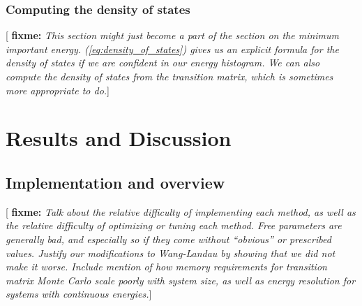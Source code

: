 \documentclass[11pt]{article}
\newcommand{\red}[1]{{\bf \color{red} #1}}
\newcommand{\fixme}[1]{[\red{fixme:} \emph{#1}]}
\begin{document}
\subsubsection{Computing the density of states}
\label{sec:dos}

\fixme{This section might just become a part of the section on the
  minimum important energy. (\ref{eq:density_of_states}) gives us an
  explicit formula for the density of states if we are confident in
  our energy histogram. We can also compute the density of states from
  the transition matrix, which is sometimes more appropriate to do.}





\section{Results and Discussion}
\label{sec:results}

\subsection{Implementation and overview}
\label{sec:implementation}

\fixme{Talk about the relative difficulty of implementing each method,
  as well as the relative difficulty of optimizing or tuning each
  method. Free parameters are generally bad, and especially so if they
  come without ``obvious'' or prescribed values. Justify our
  modifications to Wang-Landau by showing that we did not make it
  worse. Include mention of how memory requirements for transition
  matrix Monte Carlo scale poorly with system size, as well as energy
  resolution for systems with continuous energies.}
\end{document}
